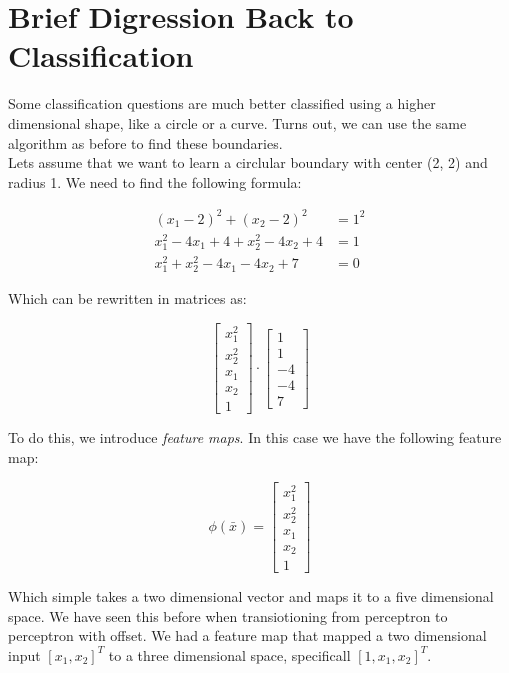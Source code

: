 \documentclass[12pt]{article}
\begin{document}
\section{Brief Digression Back to Classification}

Some classification questions are much better classified using a higher dimensional shape, like a circle or a curve. Turns out, we can use the same algorithm as before to find these boundaries.\\

Lets assume that we want to learn a circlular boundary with center (2, 2) and radius 1. We need to find the following formula:

\[ 
	\begin{aligned}
		(x_1 - 2)^2 + (x_2 - 2)^2 &= 1^2\\
		x_1^2 - 4x_1 + 4 + x_2^2 - 4x_2 + 4 &= 1\\
		x_1^2 + x_2^2 - 4x_1 - 4x_2 + 7 &= 0
	\end{aligned}
\]

Which can be rewritten in matrices as:

\[ 
	\begin{bmatrix}
		x_1^2\\
		x_2^2\\
		x_1\\
		x_2\\
		1
	\end{bmatrix}
	\cdot
	\begin{bmatrix}
		1\\
		1\\
		-4\\
		-4\\
		7
	\end{bmatrix}
\]

To do this, we introduce \emph{feature maps}. In this case we have the following feature map:

\[
	\phi(\bar x) = 
	\begin{bmatrix} 
		 x_1^2\\
		 x_2^2\\
		 x_1\\
		 x_2\\
		 1
	\end{bmatrix}
\]

Which simple takes a two dimensional vector and maps it to a five dimensional space. We have seen this before when transiotioning from perceptron to perceptron with offset. We had a feature map that mapped a two dimensional input $[x_1, x_2]^T$ to a three dimensional space, specificall $[1, x_1, x_2]^T$.\\
\end{document}
